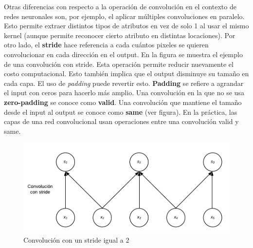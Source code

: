 Otras diferencias con respecto a la operaci\'on de convoluci\'on en el contexto de redes neuronales son, por ejemplo, el aplicar m\'ultiples convoluciones en paralelo. Esto permite extraer distintos tipos de atributos en vez de solo 1 al usar el mismo kernel (aunque permite reconocer cierto atributo en distintas locaciones). Por otro lado, el \textbf{stride} hace referencia a cada cu\'antos pixeles se quieren convolucionar en cada direcci\'on en el output. En la figura se muestra el ejemplo de una convoluci\'on con stride. Esta operaci\'on permite reducir nuevamente el costo computacional. Esto tambi\'en implica que el output disminuye su tama{\~{n}}o en cada capa. El uso de \textit{padding} puede revertir esto. \textbf{Padding} se refiere a agrandar el input con ceros para hacerlo m\'as amplio. Una convoluci\'on en la que no se usa \textbf{zero-padding} se conoce como \textbf{valid}. Una convoluci\'on que mantiene el tama{\~{n}}o desde el input al output se conoce como \textbf{same} (ver figura). En la pr\'actica, las capas de una red convolucional usan operaciones entre una convoluci\'on valid y same.

\begin{figure}[H]
\captionsetup{font=small,labelfont=small}
\caption{Convoluci\'on con un stride igual a 2}
\centering
\includegraphics[scale=.8]{img/stride.png}
\end{figure}

